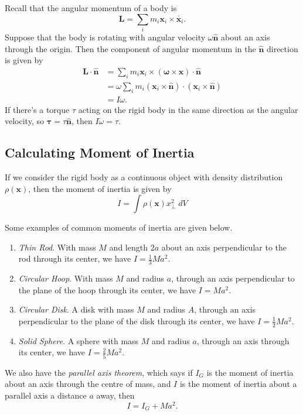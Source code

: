 \documentclass{scrartcl}
\newcommand{\vv}[1]{\boldsymbol{\mathbf{#1}}}
\theoremstyle{definition}
\newcommand{\hh}[1]{\hat{\vv{#1}}}
\begin{document}
Recall that the angular momentum of a body is
$$
\vv L = \sum_i m_i \vv x_i \times  \dot{\vv x_i}.
$$
Suppose that the body is rotating with angular velocity $\omega \hh n$ about an axis through the origin. Then the component of angular momentum in the $\hh n$ direction is given by
\begin{align*}
	\vv L \cdot \hh n &= \sum_i m_i \vv x_i \times (\vv \omega \times \vv x) \cdot \hh n \\
	&= \omega \sum_i m_i (\vv x_i \times \hh n) \cdot (\vv x_i \times \hh n) \\
	&= I \omega.
\end{align*}
If there's a torque $\tau$ acting on the rigid body in the same direction as the angular velocity, so $\vv \tau = \tau \hh n$, then $I \dot{\omega} = \tau$.

\subsection*{Calculating Moment of Inertia}

If we consider the rigid body as a continuous object with density distribution $\rho (\vv x)$, then the moment of inertia is given by
$$
I = \int \rho (\vv x) x_{\perp}^2 \; dV
$$

Some examples of common moments of inertia are given below.
\begin{enumerate}
	\item \emph{Thin Rod}. With mass $M$ and length $2a$ about an axis perpendicular to the rod through its center, we have $I = \frac{1}{3}M a^2$.
	\item \emph{Circular Hoop}. With mass $M$ and radius $a$, through an axis perpendicular to the plane of the hoop through its center, we have $I = Ma^2$.
	\item \emph{Circular Disk}. A disk with mass $M$ and radius $A$, through an axis perpendicular to the plane of the disk through its center, we have $I = \frac{1}{2}Ma^2$.
	\item \emph{Solid Sphere}. A sphere with mass $M$ and radius $a$, through an axis through its center, we have $I = \frac{2}{5}Ma^2$. 
\end{enumerate}

We also have the \emph{parallel axis theorem}, which says if $I_G$ is the moment of inertia about an axis through the centre of mass, and $I$ is the moment of inertia about a parallel axis a distance $a$ away, then
$$
I= I_G + Ma^2.
$$
\end{document}
